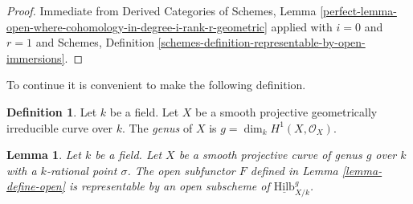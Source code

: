 \documentclass{stacks-project}
\theoremstyle{plain}
\newtheorem{lemma}[subsection]{Lemma}
\theoremstyle{definition}
\newtheorem{definition}[subsection]{Definition}
\theoremstyle{remark}
\numberwithin{equation}{subsection}
\def\Hilbfunctor{\mathrm{Hilb}}
\begin{document}
\begin{proof}
Immediate from Derived Categories of Schemes, Lemma
\ref{perfect-lemma-open-where-cohomology-in-degree-i-rank-r-geometric}
applied with $i = 0$ and $r = 1$ and
Schemes, Definition \ref{schemes-definition-representable-by-open-immersions}.
\end{proof}

\noindent
To continue it is convenient to make the following definition.

\begin{definition}
\label{definition-genus}
Let $k$ be a field. Let $X$ be a smooth projective geometrically irreducible
curve over $k$. The {\it genus} of $X$ is $g = \dim_k H^1(X, \mathcal{O}_X)$.
\end{definition}

\begin{lemma}
\label{lemma-open-representable}
Let $k$ be a field. Let $X$ be a smooth projective curve of genus $g$
over $k$ with a $k$-rational point $\sigma$. The open subfunctor $F$ defined
in Lemma \ref{lemma-define-open} is representable by an open subscheme of
$\underline{\Hilbfunctor}^g_{X/k}$.
\end{lemma}
\end{document}
